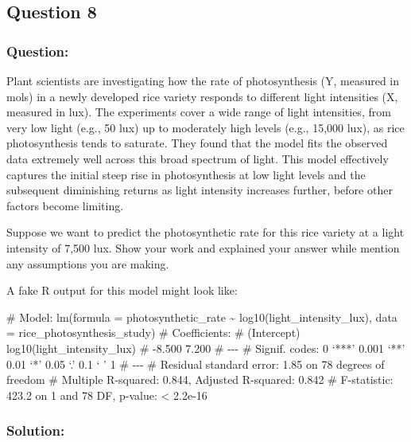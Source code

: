 \documentclass[
  letterpaper,
  DIV=11,
  numbers=noendperiod]{scrartcl}
\newenvironment{Shaded}{\begin{snugshade}}{\end{snugshade}}
\newcommand{\CommentTok}[1]{\textcolor[rgb]{0.37,0.37,0.37}{#1}}
\begin{document}
\newpage

\subsection{Question 8}\label{question-8}

\subsubsection{Question:}\label{question-1}

Plant scientists are investigating how the rate of photosynthesis (Y,
measured in mols) in a newly developed rice variety responds to
different light intensities (X, measured in lux). The experiments cover
a wide range of light intensities, from very low light (e.g., 50 lux) up
to moderately high levels (e.g., 15,000 lux), as rice photosynthesis
tends to saturate. They found that the model fits the observed data
extremely well across this broad spectrum of light. This model
effectively captures the initial steep rise in photosynthesis at low
light levels and the subsequent diminishing returns as light intensity
increases further, before other factors become limiting.

Suppose we want to predict the photosynthetic rate for this rice variety
at a light intensity of 7,500 lux. Show your work and explained your
answer while mention any assumptions you are making.

A fake R output for this model might look like:

\begin{Shaded}
\begin{Highlighting}[]
\CommentTok{\# Model: lm(formula = photosynthetic\_rate \textasciitilde{} log10(light\_intensity\_lux), data = rice\_photosynthesis\_study)}
\CommentTok{\# Coefficients:}
\CommentTok{\# (Intercept)                   log10(light\_intensity\_lux)}
\CommentTok{\# {-}8.500                                 7.200}
\CommentTok{\# {-}{-}{-}}
\CommentTok{\# Signif. codes:  0 ‘***’ 0.001 ‘**’ 0.01 ‘*’ 0.05 ‘.’ 0.1 ‘ ’ 1}
\CommentTok{\# {-}{-}{-}}
\CommentTok{\# Residual standard error: 1.85 on 78 degrees of freedom}
\CommentTok{\# Multiple R{-}squared: 0.844,    Adjusted R{-}squared: 0.842}
\CommentTok{\# F{-}statistic: 423.2 on 1 and 78 DF,  p{-}value: \textless{} 2.2e{-}16}
\end{Highlighting}
\end{Shaded}

\subsubsection{Solution:}\label{solution-1}
\end{document}

